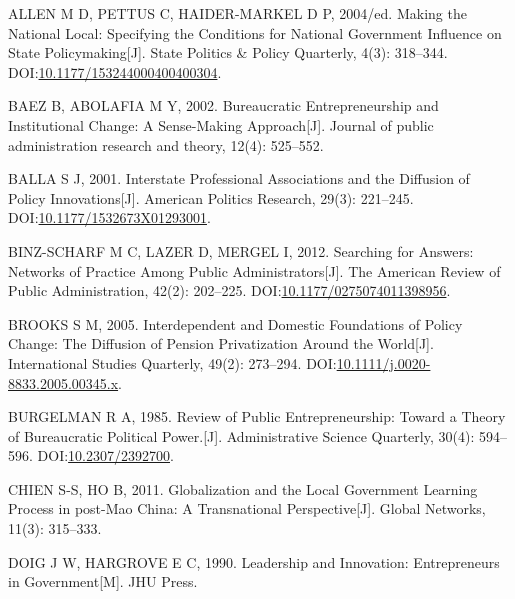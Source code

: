 \documentclass[
  12pt,
]{ctexart}
\newlength{\cslhangindent}
\newlength{\cslentryspacingunit} %
\newenvironment{CSLReferences}[2] %
 {%
  \setlength{\parindent}{0pt}
  \ifodd #1
  \let\oldpar\par
  \def\par{\hangindent=\cslhangindent\oldpar}
  \fi
  \setlength{\parskip}{#2\cslentryspacingunit}
 }%
 {}
\begin{document}
\hypertarget{refs}{}
\begin{CSLReferences}{1}{0}
\leavevmode{}%
ALLEN M D, PETTUS C, HAIDER-MARKEL D P, 2004/ed. Making the {National Local}: {Specifying} the {Conditions} for {National Government Influence} on {State Policymaking}{[}J{]}. State Politics \& Policy Quarterly, 4(3): 318--344. DOI:\href{https://doi.org/10.1177/153244000400400304}{10.1177/153244000400400304}.

\leavevmode{}%
BAEZ B, ABOLAFIA M Y, 2002. Bureaucratic Entrepreneurship and Institutional Change: A Sense-Making Approach{[}J{]}. Journal of public administration research and theory, 12(4): 525--552.

\leavevmode{}%
BALLA S J, 2001. Interstate {Professional Associations} and the {Diffusion} of {Policy Innovations}{[}J{]}. American Politics Research, 29(3): 221--245. DOI:\href{https://doi.org/10.1177/1532673X01293001}{10.1177/1532673X01293001}.

\leavevmode{}%
BINZ-SCHARF M C, LAZER D, MERGEL I, 2012. Searching for {Answers}: {Networks} of {Practice Among Public Administrators}{[}J{]}. The American Review of Public Administration, 42(2): 202--225. DOI:\href{https://doi.org/10.1177/0275074011398956}{10.1177/0275074011398956}.

\leavevmode{}%
BROOKS S M, 2005. Interdependent and {Domestic Foundations} of {Policy Change}: {The Diffusion} of {Pension Privatization Around} the {World}{[}J{]}. International Studies Quarterly, 49(2): 273--294. DOI:\href{https://doi.org/10.1111/j.0020-8833.2005.00345.x}{10.1111/j.0020-8833.2005.00345.x}.

\leavevmode{}%
BURGELMAN R A, 1985. Review of {Public Entrepreneurship}: {Toward} a {Theory} of {Bureaucratic Political Power}.{[}J{]}. Administrative Science Quarterly, 30(4): 594--596. DOI:\href{https://doi.org/10.2307/2392700}{10.2307/2392700}.

\leavevmode{}%
CHIEN S-S, HO B, 2011. Globalization and the Local Government Learning Process in post-{Mao China}: A Transnational Perspective{[}J{]}. Global Networks, 11(3): 315--333.

\leavevmode{}%
DOIG J W, HARGROVE E C, 1990. Leadership and Innovation: {Entrepreneurs} in Government{[}M{]}. {JHU Press}.


\end{CSLReferences}
\end{document}
